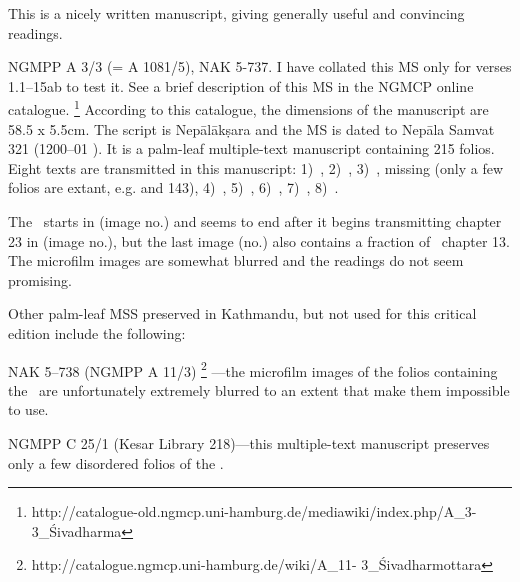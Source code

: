 This is a nicely written manuscript, giving generally useful and
convincing readings. 


NGMPP A 3/3 (= A 1081/5), NAK 5-737. I have collated 
this MS only for verses 1.1--15ab to test it. 
See a brief description of this MS in the NGMCP online
catalogue.%
	\footnote{http://catalogue-old.ngmcp.uni-hamburg.de/mediawiki/index.php/A\_3-3\_Śivadharma} 
According to this catalogue, the dimensions of the manuscript are
58.5 x 5.5cm. The script is Nepālākṣara and the MS is dated 
to Nepāla Samvat 321 (1200--01 \CE). It is a palm-leaf multiple-text manuscript containing 215 folios.
Eight texts are transmitted in this manuscript: 
1)~, 
2)~,
3)~, 
	missing (only a few folios are extant, e.g.  and 143), 
4)~, 
5)~,
6)~,
7)~,
8)~.

The \VSS\ starts in  (image no.) 
and seems to end after it begins transmitting chapter 23 
in  (image no.), but the last image 
(no.) also contains a fraction of \VSS\ chapter 13.
The microfilm images are somewhat blurred and the 
readings do not seem promising.

\bigskip
\bigskip

\noindent
Other palm-leaf MSS preserved in Kathmandu, but not used for
this critical edition include the following:

NAK 5--738 (NGMPP A 11/3)%
	\footnote{http://catalogue.ngmcp.uni-hamburg.de/wiki/A\_11- 3\_Śivadharmottara}%
---the microfilm images of the folios containing the \VSS\ are unfortunately extremely blurred to an extent that make them
impossible to use.


NGMPP C 25/1 (Kesar Library 218)---this multiple-text manuscript
preserves only a few disordered folios of the \VSS.

